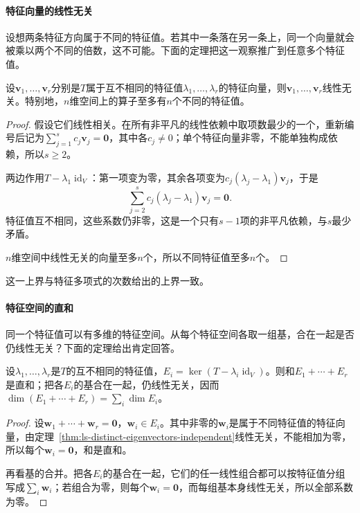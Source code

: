 \paragraph{特征向量的线性无关}
设想两条特征方向属于不同的特征值。若其中一条落在另一条上，同一个向量就会被乘以两个不同的倍数，这不可能。下面的定理把这一观察推广到任意多个特征值。
\begin{theorem}[不同特征值的特征向量线性无关]
\label{thm:ls-distinct-eigenvectors-independent}
设$\bm v_1,\ldots,\bm v_r$分别是$T$属于互不相同的特征值$\lambda_1,\ldots,\lambda_r$的特征向量，则$\bm v_1,\ldots,\bm v_r$线性无关。特别地，$n$维空间上的算子至多有$n$个不同的特征值。
\end{theorem}
\begin{proof}
假设它们线性相关。在所有非平凡的线性依赖中取项数最少的一个，重新编号后记为$\sum_{j=1}^s c_j\bm v_j=\bm0$，其中各$c_j\neq0$；单个特征向量非零，不能单独构成依赖，所以$s\geq2$。

两边作用$T-\lambda_1\operatorname{id}_V$：第一项变为零，其余各项变为$c_j(\lambda_j-\lambda_1)\bm v_j$，于是
\[
 \sum_{j=2}^s c_j(\lambda_j-\lambda_1)\bm v_j=\bm0 .
\]
特征值互不相同，这些系数仍非零，这是一个只有$s-1$项的非平凡依赖，与$s$最少矛盾。

$n$维空间中线性无关的向量至多$n$个，所以不同特征值至多$n$个。
\end{proof}
这一上界与特征多项式的次数给出的上界一致。

\paragraph{特征空间的直和}
同一个特征值可以有多维的特征空间。从每个特征空间各取一组基，合在一起是否仍线性无关？下面的定理给出肯定回答。
\begin{theorem}[特征空间之和是直和]
\label{thm:ls-eigenspaces-direct-sum}
设$\lambda_1,\ldots,\lambda_r$是$T$的互不相同的特征值，$E_i=\ker(T-\lambda_i\operatorname{id}_V)$。则和$E_1+\cdots+E_r$是直和；把各$E_i$的基合在一起，仍线性无关，因而$\dim(E_1+\cdots+E_r)=\sum_i\dim E_i$。
\end{theorem}
\begin{proof}
设$\bm w_1+\cdots+\bm w_r=\bm0$，$\bm w_i\in E_i$。其中非零的$\bm w_i$是属于不同特征值的特征向量，由定理~\ref{thm:ls-distinct-eigenvectors-independent}线性无关，不能相加为零，所以每个$\bm w_i=\bm0$，和是直和。

再看基的合并。把各$E_i$的基合在一起，它们的任一线性组合都可以按特征值分组写成$\sum_i\bm w_i$；若组合为零，则每个$\bm w_i=\bm0$，而每组基本身线性无关，所以全部系数为零。
\end{proof}

